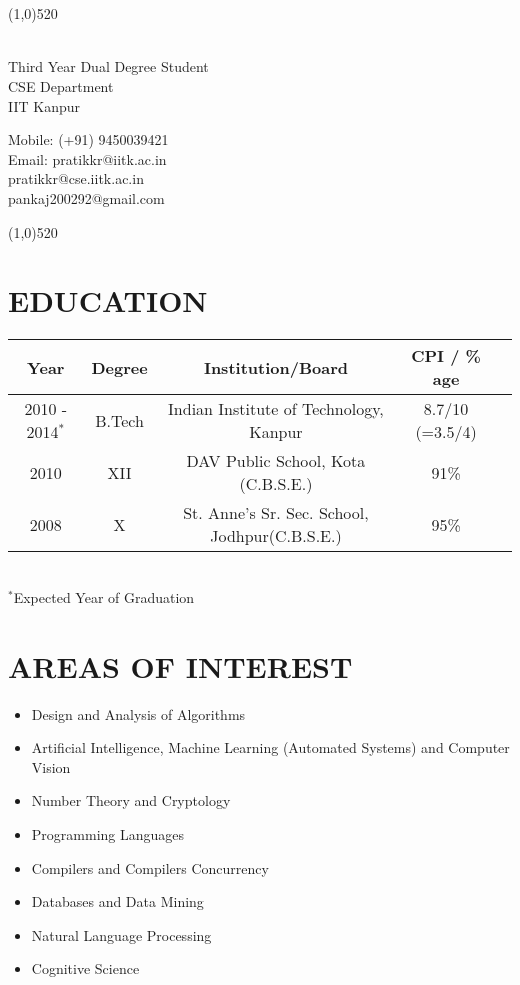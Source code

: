 \documentclass{article}
\date{}
\begin{document}

\section*{\huge {}}
\line(1,0){520}\\ \\
\begin{minipage}{0.5\textwidth}
Third Year Dual Degree Student\\
CSE Department\\
IIT Kanpur\\
\end{minipage}
\begin{minipage}{0.5\textwidth}\begin{flushright}
Mobile: (+91) 9450039421\\
Email: pratikkr@iitk.ac.in\\
pratikkr@cse.iitk.ac.in\\
pankaj200292@gmail.com\\ \end{flushright}
\end{minipage}
\line(1,0){520}

\section*{EDUCATION}

\begin{center}
\begin{tabular}{ | c | c | c | c | c | }
\hline
\textbf{Year} & \textbf{Degree} & \textbf{Institution/Board} & \textbf{CPI / \% age} \\ \hline
2010 - 2014$^{*}$ & B.Tech & Indian Institute of Technology, Kanpur & 8.7/10 (=3.5/4) \\ \hline
2010 & XII & DAV Public School, Kota (C.B.S.E.) & 91\%  \\ \hline
2008 & X  & St. Anne's Sr. Sec. School, Jodhpur(C.B.S.E.) & 95\%  \\ \hline
\end{tabular}
\end{center}
\\
${}^*$Expected Year of Graduation

\section*{AREAS OF INTEREST}
\begin{itemize}
	\item Design and Analysis of Algorithms
	\item Artificial Intelligence, Machine Learning (Automated Systems) and Computer Vision
	\item Number Theory and Cryptology
	\item Programming Languages
	\item Compilers and Compilers Concurrency
	\item Databases and Data Mining
	\item Natural Language Processing
	\item Cognitive Science
\end{itemize}
\end{document}
